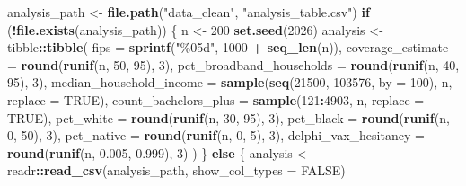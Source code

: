 \documentclass[
  11pt,
]{article}
\newenvironment{Shaded}{\begin{snugshade}}{\end{snugshade}}
\newcommand{\AttributeTok}[1]{\textcolor[rgb]{0.13,0.29,0.53}{#1}}
\newcommand{\ConstantTok}[1]{\textcolor[rgb]{0.56,0.35,0.01}{#1}}
\newcommand{\ControlFlowTok}[1]{\textcolor[rgb]{0.13,0.29,0.53}{\textbf{#1}}}
\newcommand{\DecValTok}[1]{\textcolor[rgb]{0.00,0.00,0.81}{#1}}
\newcommand{\FloatTok}[1]{\textcolor[rgb]{0.00,0.00,0.81}{#1}}
\newcommand{\FunctionTok}[1]{\textcolor[rgb]{0.13,0.29,0.53}{\textbf{#1}}}
\newcommand{\NormalTok}[1]{#1}
\newcommand{\OtherTok}[1]{\textcolor[rgb]{0.56,0.35,0.01}{#1}}
\newcommand{\SpecialCharTok}[1]{\textcolor[rgb]{0.81,0.36,0.00}{\textbf{#1}}}
\newcommand{\StringTok}[1]{\textcolor[rgb]{0.31,0.60,0.02}{#1}}
\begin{document}
\begin{Shaded}
\begin{Highlighting}[]
\NormalTok{analysis\_path }\OtherTok{\textless{}{-}} \FunctionTok{file.path}\NormalTok{(}\StringTok{"data\_clean"}\NormalTok{, }\StringTok{"analysis\_table.csv"}\NormalTok{)}
\ControlFlowTok{if}\NormalTok{ (}\SpecialCharTok{!}\FunctionTok{file.exists}\NormalTok{(analysis\_path)) \{}
\NormalTok{  n }\OtherTok{\textless{}{-}} \DecValTok{200}
  \FunctionTok{set.seed}\NormalTok{(}\DecValTok{2026}\NormalTok{)}
\NormalTok{  analysis }\OtherTok{\textless{}{-}}\NormalTok{ tibble}\SpecialCharTok{::}\FunctionTok{tibble}\NormalTok{(}
    \AttributeTok{fips =} \FunctionTok{sprintf}\NormalTok{(}\StringTok{"\%05d"}\NormalTok{, }\DecValTok{1000} \SpecialCharTok{+} \FunctionTok{seq\_len}\NormalTok{(n)),}
    \AttributeTok{coverage\_estimate =} \FunctionTok{round}\NormalTok{(}\FunctionTok{runif}\NormalTok{(n, }\DecValTok{50}\NormalTok{, }\DecValTok{95}\NormalTok{), }\DecValTok{3}\NormalTok{),}
    \AttributeTok{pct\_broadband\_households =} \FunctionTok{round}\NormalTok{(}\FunctionTok{runif}\NormalTok{(n, }\DecValTok{40}\NormalTok{, }\DecValTok{95}\NormalTok{), }\DecValTok{3}\NormalTok{),}
    \AttributeTok{median\_household\_income =} \FunctionTok{sample}\NormalTok{(}\FunctionTok{seq}\NormalTok{(}\DecValTok{21500}\NormalTok{, }\DecValTok{103576}\NormalTok{, }\AttributeTok{by =} \DecValTok{100}\NormalTok{), n, }\AttributeTok{replace =} \ConstantTok{TRUE}\NormalTok{),}
    \AttributeTok{count\_bachelors\_plus =} \FunctionTok{sample}\NormalTok{(}\DecValTok{121}\SpecialCharTok{:}\DecValTok{4903}\NormalTok{, n, }\AttributeTok{replace =} \ConstantTok{TRUE}\NormalTok{),}
    \AttributeTok{pct\_white =} \FunctionTok{round}\NormalTok{(}\FunctionTok{runif}\NormalTok{(n, }\DecValTok{30}\NormalTok{, }\DecValTok{95}\NormalTok{), }\DecValTok{3}\NormalTok{),}
    \AttributeTok{pct\_black =} \FunctionTok{round}\NormalTok{(}\FunctionTok{runif}\NormalTok{(n, }\DecValTok{0}\NormalTok{, }\DecValTok{50}\NormalTok{), }\DecValTok{3}\NormalTok{),}
    \AttributeTok{pct\_native =} \FunctionTok{round}\NormalTok{(}\FunctionTok{runif}\NormalTok{(n, }\DecValTok{0}\NormalTok{, }\DecValTok{5}\NormalTok{), }\DecValTok{3}\NormalTok{),}
    \AttributeTok{delphi\_vax\_hesitancy =} \FunctionTok{round}\NormalTok{(}\FunctionTok{runif}\NormalTok{(n, }\FloatTok{0.005}\NormalTok{, }\FloatTok{0.999}\NormalTok{), }\DecValTok{3}\NormalTok{)}
\NormalTok{  )}
\NormalTok{\} }\ControlFlowTok{else}\NormalTok{ \{}
\NormalTok{  analysis }\OtherTok{\textless{}{-}}\NormalTok{ readr}\SpecialCharTok{::}\FunctionTok{read\_csv}\NormalTok{(analysis\_path, }\AttributeTok{show\_col\_types =} \ConstantTok{FALSE}\NormalTok{)}

\end{Highlighting}
\end{Shaded}
\end{document}
